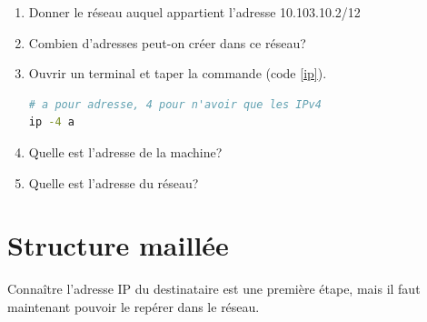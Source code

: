 \documentclass[a4paper,11pt]{article}
\begin{document}
\begin{activite}
    \begin{enumerate}
        \item Donner le réseau auquel appartient l'adresse 10.103.10.2/12
        \item Combien d'adresses peut-on créer dans ce réseau?
        \item Ouvrir un terminal et taper la commande (code \ref{ip}).
        \begin{center}
            \begin{lstlisting}[language=bash]
# a pour adresse, 4 pour n'avoir que les IPv4
ip -4 a
            \end{lstlisting}
            \label{ip}
        \end{center}

        \item Quelle est l'adresse de la machine?
        \item Quelle est l'adresse du réseau?
    \end{enumerate}
\end{activite}
\section{Structure maillée}
Connaître l'adresse IP du destinataire est une première étape, mais il faut maintenant pouvoir le repérer dans le réseau.
\end{document}
